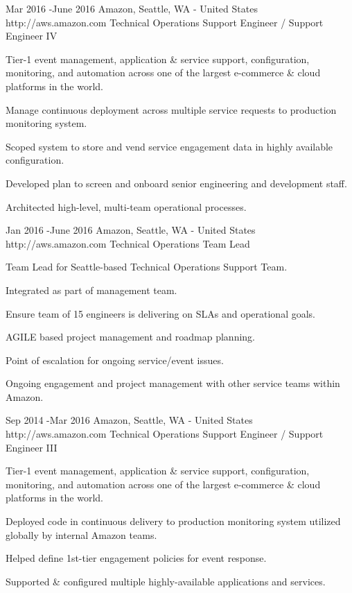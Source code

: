 \documentclass[10pt]{article} %
\begin{document}
\job
{Mar 2016 -}{June 2016}
{Amazon, Seattle, WA - United States}
{http://aws.amazon.com}
{Technical Operations Support Engineer / Support Engineer IV}
{
\begin{itemize-noindent}
\item{Tier-1 event management, application \& service support, configuration, monitoring, and automation across one of the largest e-commerce \& cloud platforms in the world.}
\item{Manage continuous deployment across multiple service requests to production monitoring system.}
\item{Scoped system to store and vend service engagement data in highly available configuration.}
\item{Developed plan to screen and onboard senior engineering and development staff.}
\item{Architected high-level, multi-team operational processes.}
\end{itemize-noindent}

}

\job
{Jan 2016 -}{June 2016}
{Amazon, Seattle, WA - United States}
{http://aws.amazon.com}
{Technical Operations Team Lead}
{
\begin{itemize-noindent}
\item{Team Lead for Seattle-based Technical Operations Support Team.}
\item{Integrated as part of management team.}
\item{Ensure team of 15 engineers is delivering on SLAs and operational goals.}
\item{AGILE based project management and roadmap planning.}
\item{Point of escalation for ongoing service/event issues.}
\item{Ongoing engagement and project management with other service teams within Amazon.}
\end{itemize-noindent}

}
	
\job
{Sep 2014 -}{Mar 2016}
{Amazon, Seattle, WA - United States}
{http://aws.amazon.com}
{Technical Operations Support Engineer / Support Engineer III}
{
\begin{itemize-noindent}
\item{Tier-1 event management, application \& service support, configuration, monitoring, and automation across one of the largest e-commerce \& cloud platforms in the world.}
\item{Deployed code in continuous delivery to production monitoring system utilized globally by internal Amazon teams.}
\item{Helped define 1st-tier engagement policies for event response.}
\item{Supported \& configured multiple highly-available applications and services.}
\end{itemize-noindent}

}
\end{document}

